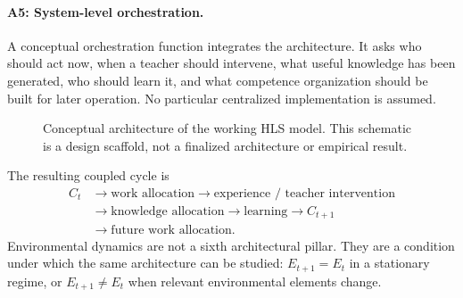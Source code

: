 \paragraph{A5: System-level orchestration.} A conceptual orchestration function integrates the architecture. It asks who should act now, when a teacher should intervene, what useful knowledge has been generated, who should learn it, and what competence organization should be built for later operation. No particular centralized implementation is assumed.

\begin{figure}[t]
\centering
{}
\caption{Conceptual architecture of the working HLS model. This schematic is a design scaffold, not a finalized architecture or empirical result.}
\label{fig:hls-architecture}
\end{figure}

The resulting coupled cycle is
\begin{equation}
\begin{aligned}
C_t &\rightarrow \text{work allocation} \rightarrow \text{experience / teacher intervention}\\
&\rightarrow \text{knowledge allocation} \rightarrow \text{learning} \rightarrow C_{t+1}\\
&\rightarrow \text{future work allocation}.
\end{aligned}
\label{eq:hls-cycle}
\end{equation}
Environmental dynamics are not a sixth architectural pillar. They are a condition under which the same architecture can be studied: $E_{t+1}=E_t$ in a stationary regime, or $E_{t+1}\neq E_t$ when relevant environmental elements change.
